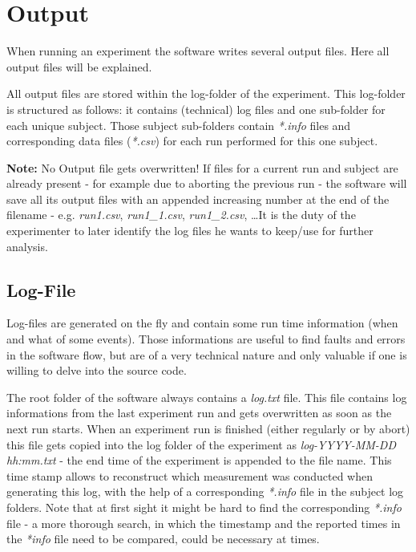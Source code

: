 \documentclass[12pt,a4paper]{book}
\begin{document}
\chapter{Output}

When running an experiment the software writes several output files. Here all output files will be explained.

All output files are stored within the log-folder of the experiment. This log-folder is structured as follows: it contains (technical) log files and one sub-folder for each unique subject. Those subject sub-folders contain \textit{*.info} files and corresponding data files (\textit{*.csv}) for each run performed for this one subject.

\textbf{Note:} No Output file gets overwritten! If files for a current run and subject are already present - for example due to aborting the previous run - the software will save all its output files with an appended increasing number at the end of the filename - e.g. \textit{run1.csv}, \textit{run1\_1.csv}, \textit{run1\_2.csv}, \dots It is the duty of the experimenter to later identify the log files he wants to keep/use for further analysis.

\section{Log-File}

Log-files are generated on the fly and contain some run time information (when and what of some events). Those informations are useful to find faults and errors in the software flow, but are of a very technical nature and only valuable if one is willing to delve into the source code.

The root folder of the software always contains a \textit{log.txt} file. This file contains log informations from the last experiment run and gets overwritten as soon as the next run starts. When an experiment run is finished (either regularly or by abort) this file gets copied into the log folder of the experiment as \textit{log-YYYY-MM-DD hh:mm.txt} - the end time of the experiment is appended to the file name. This time stamp allows to reconstruct which measurement was conducted when generating this log, with the help of a corresponding \textit{*.info} file in the subject log folders. Note that at first sight it might be hard to find the corresponding \textit{*.info} file - a more thorough search, in which the timestamp and the reported times in the \textit{*info} file need to be compared, could be necessary at times.
\end{document}
